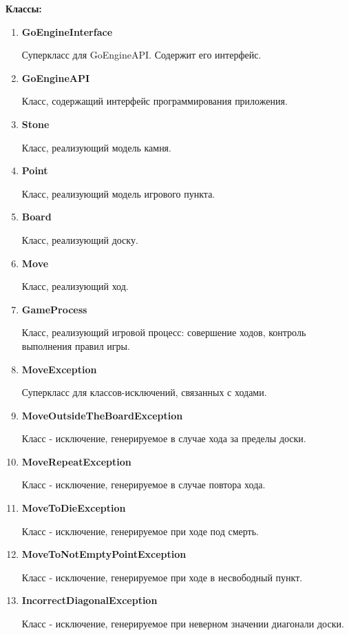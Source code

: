 \textbf{Классы:}

\begin{enumerate}

\item\textbf{GoEngineInterface}

Суперкласс для GoEngineAPI. Содержит его интерфейс.

\item\textbf{GoEngineAPI}

Класс, содержащий интерфейс программирования приложения.

\item\textbf{Stone}

Класс, реализующий модель камня.

\item\textbf{Point}

Класс, реализующий модель игрового пункта.

\item\textbf{Board}

Класс, реализующий доску.

\item\textbf{Move}

Класс, реализующий ход.

\item\textbf{GameProcess}

Класс, реализующий игровой процесс: совершение ходов, контроль выполнения правил игры.

\item\textbf{MoveException}

Суперкласс для классов-исключений, связанных с ходами.

\item\textbf{MoveOutsideTheBoardException}

Класс - исключение, генерируемое в случае хода за пределы доски.

\item\textbf{MoveRepeatException}

Класс - исключение, генерируемое в случае повтора хода.

\item\textbf{MoveToDieException}

Класс - исключение, генерируемое при ходе под смерть.

\item\textbf{MoveToNotEmptyPointException}

Класс - исключение, генерируемое при ходе в несвободный пункт.

\item\textbf{IncorrectDiagonalException}

Класс - исключение, генерируемое при неверном значении диагонали доски.

\end{enumerate}

